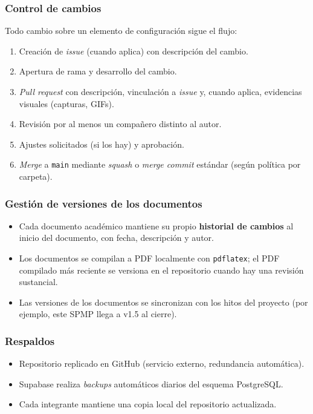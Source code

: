 \documentclass[12pt,oneside]{report}
\begin{document}
      \subsubsection{Control de cambios}
      Todo cambio sobre un elemento de configuración sigue el flujo:
      \begin{enumerate}
        \item Creación de \textit{issue} (cuando aplica) con descripción del cambio.
        \item Apertura de rama y desarrollo del cambio.
        \item \textit{Pull request} con descripción, vinculación a \textit{issue} y, cuando aplica, evidencias visuales (capturas, GIFs).
        \item Revisión por al menos un compañero distinto al autor.
        \item Ajustes solicitados (si los hay) y aprobación.
        \item \textit{Merge} a \texttt{main} mediante \textit{squash} o \textit{merge commit} estándar (según política por carpeta).
      \end{enumerate}

      \subsubsection{Gestión de versiones de los documentos}
      \begin{itemize}
        \item Cada documento académico mantiene su propio \textbf{historial de cambios} al inicio del documento, con fecha, descripción y autor.
        \item Los documentos se compilan a PDF localmente con \texttt{pdflatex}; el PDF compilado más reciente se versiona en el repositorio cuando hay una revisión sustancial.
        \item Las versiones de los documentos se sincronizan con los hitos del proyecto (por ejemplo, este SPMP llega a v1.5 al cierre).
      \end{itemize}

      \subsubsection{Respaldos}
      \begin{itemize}
        \item Repositorio replicado en GitHub (servicio externo, redundancia automática).
        \item Supabase realiza \textit{backups} automáticos diarios del esquema PostgreSQL.
        \item Cada integrante mantiene una copia local del repositorio actualizada.
      \end{itemize}
\end{document}
